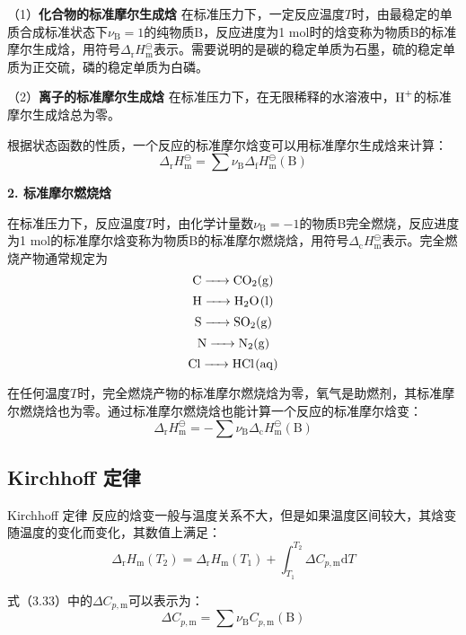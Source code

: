\documentclass[lang=cn,newtx,10pt,scheme=chinese]{elegantbook}
\begin{document}
（1）\textbf{化合物的标准摩尔生成焓} \quad 在标准压力下，一定反应温度$T$时，由最稳定的单质合成标准状态下$\nu_\mathrm{B}=1$的纯物质B，反应进度为1 mol时的焓变称为物质B的标准摩尔生成焓，用符号$\Delta_\mathrm{r}H^\ominus_\mathrm{m}$表示。需要说明的是碳的稳定单质为石墨，硫的稳定单质为正交硫，磷的稳定单质为白磷。

（2）\textbf{离子的标准摩尔生成焓} \quad 在标准压力下，在无限稀释的水溶液中，$\ce{H+}$的标准摩尔生成焓总为零。

根据状态函数的性质，一个反应的标准摩尔焓变可以用标准摩尔生成焓来计算：
\begin{equation}
	\Delta_\mathrm{r}H^\ominus _\mathrm{m}=\sum \nu _\mathrm{B}\Delta _\mathrm{f}H^\ominus _\mathrm{m}(\mathrm{B} )     
\end{equation}

\textbf{2. 标准摩尔燃烧焓}

在标准压力下，反应温度$T$时，由化学计量数$\nu_\mathrm{B}=-1$的物质B完全燃烧，反应进度为1 mol的标准摩尔焓变称为物质B的标准摩尔燃烧焓，用符号$\Delta_\mathrm{c}H^\ominus_\mathrm{m}$表示。完全燃烧产物通常规定为
$$\ce{C -> CO2(g)}$$
$$\ce{H -> H2O(l)}$$
$$\ce{S -> SO2(g)}$$
$$\ce{N -> N2(g)}$$
$$\ce{Cl -> HCl(aq)}$$

在任何温度$T$时，完全燃烧产物的标准摩尔燃烧焓为零，氧气是助燃剂，其标准摩尔燃烧焓也为零。通过标准摩尔燃烧焓也能计算一个反应的标准摩尔焓变：
\begin{equation}
	\Delta_\mathrm{r}H^\ominus _\mathrm{m}=-\sum \nu _\mathrm{B}\Delta _\mathrm{c}H^\ominus _\mathrm{m}(\mathrm{B} )     
\end{equation}

\subsection{Kirchhoff 定律}
\begin{theorem}{Kirchhoff 定律}
	反应的焓变一般与温度关系不大，但是如果温度区间较大，其焓变随温度的变化而变化，其数值上满足：
	\begin{equation}
		\Delta_\mathrm{r}  H_\mathrm{m}(T_2)= \Delta_\mathrm{r}  H_\mathrm{m}(T_1)+\int_{T_1}^{T_2}\Delta C_{p,\mathrm{m} } \mathrm{d}T 
	\end{equation}
\end{theorem}

式（3.33）中的$\Delta C_{p,\mathrm{m} }$可以表示为：
\begin{equation}
	\Delta C_{p,\mathrm{m} }=\sum \nu_\mathrm{B} C_{p,\mathrm{m} }(\mathrm{B})
\end{equation}
\end{document}
